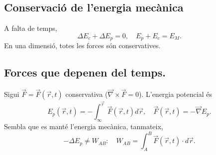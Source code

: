 \subsection{Conservació de l'energia mecànica}
A falta de temps,
\[\Delta E_c+\Delta E_p=0,\quad E_p+E_c=E_M.\]
En una dimensió, totes les forces són conservatives.
\subsection{Forces que depenen del temps.}
Sigui $\vec{F}=\vec{F}(\vec{r}, t)$ conservativa ($\vec{\nabla}\times\vec{F}=0$). L'energia potencial és
\[E_p(\vec r, t)=-\int_{\infty}^{\vec r}\vec{F}(\vec{r}, t)d\vec{r},\quad \vec{F}(\vec{r}, t)=-\vec{\nabla}E_p.\]
Sembla que es manté l'energia mecànica, tanmateix,
\[-\Delta E_p\neq W_{AB}:\quad W_{AB}=\int_A^B\vec{F}(\vec{r}, t)\cdot d\vec r.\]